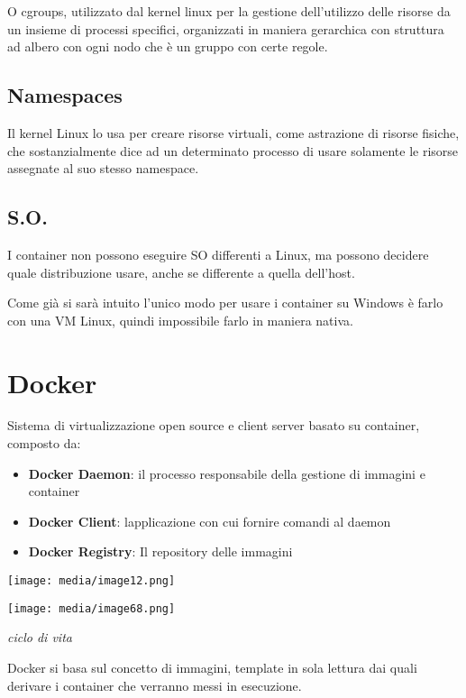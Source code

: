O cgroups, utilizzato dal kernel linux per la gestione dell'utilizzo
delle risorse da un insieme di processi specifici, organizzati in
maniera gerarchica con struttura ad albero con ogni nodo che è un gruppo
con certe regole.

\subsection{Namespaces}\label{namespaces}

Il kernel Linux lo usa per creare risorse virtuali, come astrazione di
risorse fisiche, che sostanzialmente dice ad un determinato processo di
usare solamente le risorse assegnate al suo stesso namespace.

\subsection{S.O.}\label{s.o.}

I container non possono eseguire SO differenti a Linux, ma possono
decidere quale distribuzione usare, anche se differente a quella
dell'host.

Come già si sarà intuito l'unico modo per usare i container su Windows è
farlo con una VM Linux, quindi impossibile farlo in maniera nativa.

\section{Docker}\label{docker}

Sistema di virtualizzazione open source e client server basato su
container, composto da:

\begin{itemize}
\item
  \textbf{Docker Daemon}: il processo responsabile della gestione di
  immagini e container
\item
  \textbf{Docker Client}: l\textquotesingle applicazione con cui fornire
  comandi al daemon
\item
  \textbf{Docker Registry}: Il repository delle immagini
\end{itemize}

\texttt{[image: media/image12.png]}

\texttt{[image: media/image68.png]}

\emph{ciclo di vita}

Docker si basa sul concetto di immagini, template in sola lettura dai
quali derivare i container che verranno messi in esecuzione.

